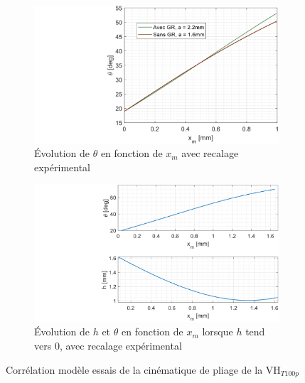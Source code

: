 \begin{figure}[!htb]
	\begin{center}
		\begin{subfigure}[b]{0.49\textwidth}
			\captionsetup{justification=centering}
			\includegraphics[trim={10cm 0cm 0cm 0cm},clip,width=\textwidth]{../Chap6/Figure/theta_vs_xm_avec_et_sans_gaine_experimental.pdf}
			\caption{Évolution de $\theta$ en fonction de $x_m$ avec recalage expérimental}
			\label{fig:theta_vs_xm_avec_et_sans_gaine_experimental}
		\end{subfigure}
		\hfillx
		\begin{subfigure}[b]{0.5\textwidth}
			\captionsetup{justification=centering}
			\includegraphics[trim={9cm 0cm 0cm 0cm},clip,width=\textwidth]{../Chap6/Figure/theta_saut_experimental.pdf}
			\caption{Évolution de $h$ et $\theta$ en fonction de $x_m$ lorsque $h$ tend vers 0, avec recalage expérimental}
			\label{fig:theta_saut_experimental}
		\end{subfigure}
		\caption{Corrélation modèle essais de la cinématique de pliage de la VH$_{T100p}$}
		\label{fig:Corrélation modèle cinématique VH}
	\end{center}
\end{figure}

